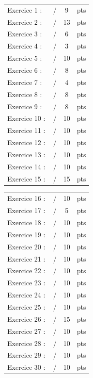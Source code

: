 \renewcommand{\arraystretch}{1.5}
\begin{tabularx}{0.42\textwidth}{lXcl}
Exercice 1 : & \dotfill\,/ &9 &pts\\
Exercice 2 : & \dotfill\,/ &13 &pts\\
Exercice 3 : & \dotfill\,/ &6 &pts\\
Exercice 4 : & \dotfill\,/ &3 &pts\\
Exercice 5 : & \dotfill\,/ &10 &pts\\
Exercice 6 : & \dotfill\,/ &8 &pts\\
Exercice 7 : & \dotfill\,/ &4 &pts\\
Exercice 8 : & \dotfill\,/ &8 &pts\\
Exercice 9 : & \dotfill\,/ &8 &pts\\
Exercice 10 : & \dotfill\,/ & 10&pts\\
Exercice 11 : & \dotfill\,/ &10 &pts\\
Exercice 12 : & \dotfill\,/ &10 &pts\\
Exercice 13 : & \dotfill\,/ &10 &pts\\
Exercice 14 : & \dotfill\,/ & 10&pts\\
Exercice 15 : & \dotfill\,/ & 15&pts\\
\end{tabularx}
\hfill
\begin{tabularx}{0.42\textwidth}{lXcl}
Exercice 16 : & \dotfill\,/ &10 &pts\\
Exercice 17 : & \dotfill\,/ &5 &pts\\
Exercice 18 : & \dotfill\,/ & 10&pts\\
Exercice 19 : & \dotfill\,/ &10 &pts\\
Exercice 20 : & \dotfill\,/ &10 &pts\\
Exercice 21 : & \dotfill\,/ &10 &pts\\
Exercice 22 : & \dotfill\,/ & 10&pts\\
Exercice 23 : & \dotfill\,/ &10 &pts\\
Exercice 24 : & \dotfill\,/ &10 &pts\\
Exercice 25 : & \dotfill\,/ & 10&pts\\
Exercice 26 : & \dotfill\,/ &15 &pts\\
Exercice 27 : & \dotfill\,/ &10 &pts\\
Exercice 28 : & \dotfill\,/ & 10&pts\\
Exercice 29 : & \dotfill\,/ &10 &pts\\
Exercice 30 : & \dotfill\,/ &10 &pts\\
\end{tabularx}
\renewcommand{\arraystretch}{1.7}


